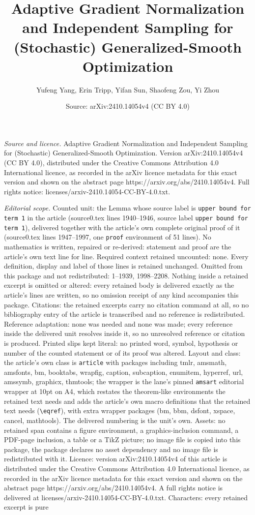 \documentclass[10pt,a4paper]{amsart}
\title[Adaptive Gradient Normalization and Independent Sampling for]{Adaptive Gradient Normalization and Independent Sampling for (Stochastic) Generalized-Smooth Optimization}
\author{Yufeng Yang, Erin Tripp, Yifan Sun, Shaofeng Zou, Yi Zhou}
\date{Source: arXiv:2410.14054v4 (CC BY 4.0)}
\begin{document}
\maketitle

\noindent\emph{Source and licence.} Adaptive Gradient Normalization and Independent Sampling for (Stochastic) Generalized-Smooth Optimization. Version arXiv:2410.14054v4 (CC BY 4.0), distributed under the Creative Commons Attribution 4.0 International licence, as recorded in the arXiv licence metadata for this exact version and shown on the abstract page https://arxiv.org/abs/2410.14054v4. Full rights notice: licenses/arxiv-2410.14054-CC-BY-4.0.txt.\par\smallskip

\noindent\textit{Editorial scope.} Counted unit: the Lemma whose source label is \texttt{upper bound for term 1} in the article (source0.tex lines 1940--1946, source label \texttt{upper bound for term 1}), delivered together with the article's own complete original proof of it (source0.tex lines 1947--1997, one \texttt{proof} environment of 51 lines). No mathematics is written, repaired or re-derived: statement and proof are the article's own text line for line. Required context retained uncounted: none. Every definition, display and label of those lines is retained unchanged. Omitted from this package and not redistributed: 1--1939, 1998--2208. Nothing inside a retained excerpt is omitted or altered: every retained body is delivered exactly as the article's lines are written, so no omission receipt of any kind accompanies this package. Citations: the retained excerpts carry no citation command at all, so no bibliography entry of the article is transcribed and no reference is redistributed. Reference adaptation: none was needed and none was made; every reference inside the delivered unit resolves inside it, so no unresolved reference or citation is produced. Printed slips kept literal: no printed word, symbol, hypothesis or number of the counted statement or of its proof was altered. Layout and class: the article's own class is \texttt{article} with packages including tmlr, amsmath, amsfonts, bm, booktabs, wrapfig, caption, subcaption, enumitem, hyperref, url, amssymb, graphicx, thmtools; the wrapper is the lane's pinned \texttt{amsart} editorial wrapper at 10pt on A4, which restates the theorem-like environments the retained text needs and adds the article's own macro definitions that the retained text needs (\texttt{\textbackslash eqref}), with extra wrapper packages (bm, bbm, dsfont, xspace, cancel, mathtools). The delivered numbering is the unit's own. Assets: no retained span contains a figure environment, a graphics-inclusion command, a PDF-page inclusion, a table or a TikZ picture; no image file is copied into this package, the package declares no asset dependency and no image file is redistributed with it. Licence: version arXiv:2410.14054v4 of this article is distributed under the Creative Commons Attribution 4.0 International licence, as recorded in the arXiv licence metadata for this exact version and shown on the abstract page https://arxiv.org/abs/2410.14054v4. A full rights notice is delivered at licenses/arxiv-2410.14054-CC-BY-4.0.txt. Characters: every retained excerpt is pure 
\end{document}
